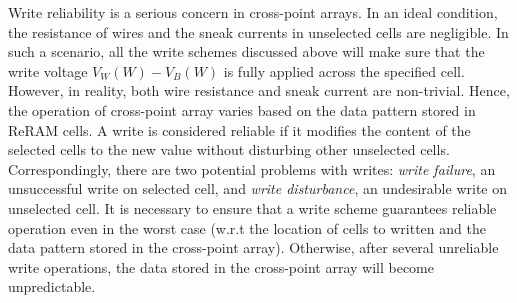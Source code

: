 Write reliability is a serious concern in cross-point arrays. In an ideal
condition, the resistance of wires and the sneak currents in unselected
cells are negligible. In such a scenario, all the write schemes discussed
above will make sure that the write voltage $V_W(W)-V_B(W)$ is fully
applied across the specified cell. However, in reality, both wire
resistance and sneak current are non-trivial. Hence, the operation of
cross-point array varies based on the data pattern stored in ReRAM cells.
A write is considered reliable if it modifies the content of the selected
cells to the new value without disturbing other unselected cells.
Correspondingly, there are two potential problems with writes: \emph{write
failure}, an unsuccessful write on selected cell, and \emph{write
disturbance}, an undesirable write on unselected cell. It is necessary to
ensure that a write scheme guarantees reliable operation even in the worst
case (w.r.t the location of cells to written and the data pattern stored
in the cross-point array). Otherwise, after several unreliable write
operations, the data stored in the cross-point array will become
unpredictable.

